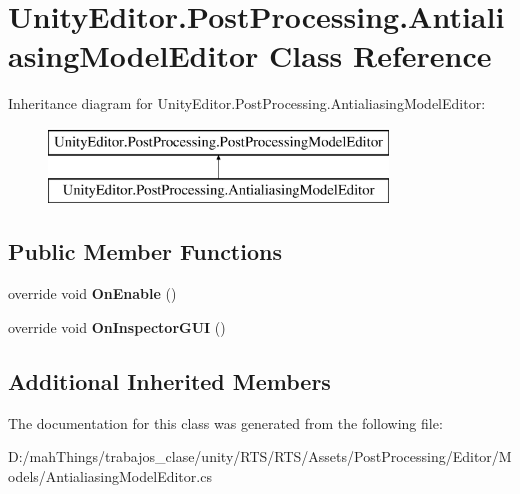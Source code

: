 \hypertarget{class_unity_editor_1_1_post_processing_1_1_antialiasing_model_editor}{}\section{Unity\+Editor.\+Post\+Processing.\+Antialiasing\+Model\+Editor Class Reference}
\label{class_unity_editor_1_1_post_processing_1_1_antialiasing_model_editor}
Inheritance diagram for Unity\+Editor.\+Post\+Processing.\+Antialiasing\+Model\+Editor\+:\begin{figure}[H]
\begin{center}
\leavevmode
\includegraphics[height=2.000000cm]{class_unity_editor_1_1_post_processing_1_1_antialiasing_model_editor}
\end{center}
\end{figure}
\subsection*{Public Member Functions}
\begin{DoxyCompactItemize}
\item 
\mbox{\label{class_unity_editor_1_1_post_processing_1_1_antialiasing_model_editor_a197f83799bb72c6f98ac55c058daa2d0}} 
override void {\bfseries On\+Enable} ()
\item 
\mbox{\label{class_unity_editor_1_1_post_processing_1_1_antialiasing_model_editor_a6309384162ac175322d6dcc44d0c2e0d}} 
override void {\bfseries On\+Inspector\+G\+UI} ()
\end{DoxyCompactItemize}
\subsection*{Additional Inherited Members}


The documentation for this class was generated from the following file\+:\begin{DoxyCompactItemize}
\item 
D\+:/mah\+Things/trabajos\+\_\+clase/unity/\+R\+T\+S/\+R\+T\+S/\+Assets/\+Post\+Processing/\+Editor/\+Models/Antialiasing\+Model\+Editor.\+cs\end{DoxyCompactItemize}
